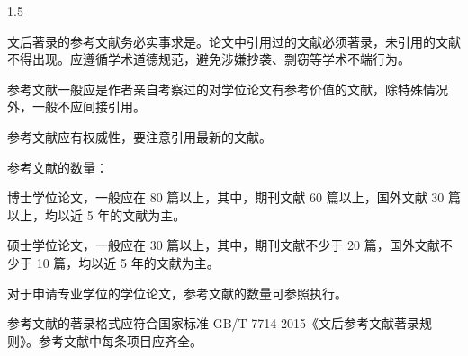 \documentclass[UTF8, scheme=chinese, openany, oneside]{ctexbook}
\begin{document}
\begin{spacing}{1.5}

\noindent \hspace{2em}文后著录的参考文献务必实事求是。论文中引用过的文献必须著录，未引用的文献不得出现。应遵循学术道德规范，避免涉嫌抄袭、剽窃等学术不端行为。

\vspace{0.3cm}
\noindent \hspace{2em}参考文献一般应是作者亲自考察过的对学位论文有参考价值的文献，除特殊情况外，一般不应间接引用。

\vspace{0.3cm}
\noindent \hspace{2em}参考文献应有权威性，要注意引用最新的文献。

\vspace{0.3cm}
\noindent \hspace{2em}参考文献的数量：

\vspace{0.3cm}
\noindent \hspace{2em}博士学位论文，一般应在 {\color{blue}80 篇以上}，其中，{\color{blue}期刊文献 60 篇以上，国外文献 30 篇以上，均以近 5 年的文献为主}。

\vspace{0.3cm}
\noindent \hspace{2em}硕士学位论文，一般应在 {\color{blue}30 篇以上}，其中，{\color{blue}期刊文献不少于 20 篇，国外文献不少于 10 篇，均以近 5 年的文献为主}。

\vspace{0.3cm}
\noindent \hspace{2em}对于申请专业学位的学位论文，参考文献的数量可参照执行。

\vspace{0.3cm}
\noindent \hspace{2em}参考文献的著录格式应符合国家标准 GB/T 7714-2015《文后参考文献著录规则》。参考文献中每条项目应齐全。
\end{spacing}


\clearpage
\thispagestyle{refdoublelinestyle}
\pagestyle{refdoublelinestyle}
\end{document}
